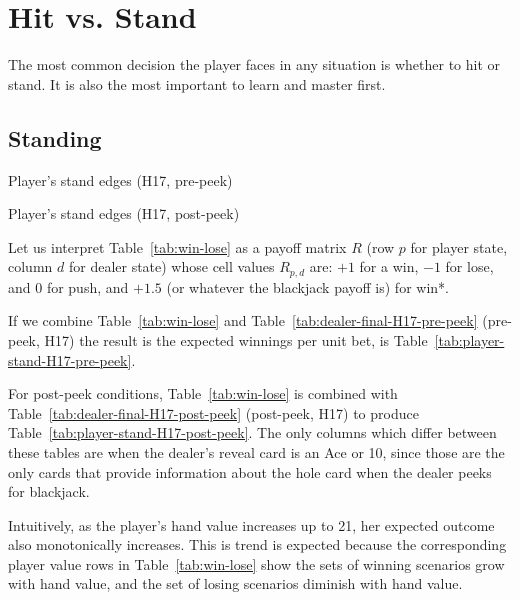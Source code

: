 \section{Hit vs. Stand}
\label{sec:basic:hit-stand}

The most common decision the player faces in any situation
is whether to hit or stand.
It is also the most important to learn and master first.

\subsection{Standing}
\label{sec:basic:hit-stand:stand}

\begin{table}[ht!]
\caption{Player's stand edges (H17, pre-peek)}
\begin{center}

\end{center}
\label{tab:player-stand-H17-pre-peek}
\end{table}

\begin{table}[ht!]
\caption{Player's stand edges (H17, post-peek)}
\begin{center}

\end{center}
\label{tab:player-stand-H17-post-peek}
\end{table}

Let us interpret Table~\ref{tab:win-lose} as a payoff matrix $R$
(row $p$ for player state, column $d$ for dealer state)
whose cell values $R_{p,d}$ are:
$+1$ for a win, $-1$ for lose, and $0$ for push, 
and $+1.5$ (or whatever the blackjack payoff is) for win*.

If we combine Table~\ref{tab:win-lose} and
Table~\ref{tab:dealer-final-H17-pre-peek} (pre-peek, H17) 
the result is the expected winnings per unit bet, 
is Table~\ref{tab:player-stand-H17-pre-peek}.

For post-peek conditions, Table~\ref{tab:win-lose} is combined with
Table~\ref{tab:dealer-final-H17-post-peek} (post-peek, H17) to produce
Table~\ref{tab:player-stand-H17-post-peek}.
The only columns which differ between these tables are when
the dealer's reveal card is an Ace or 10, since those are the only cards
that provide information about the hole card
when the dealer peeks for blackjack.

Intuitively, as the player's hand value increases up to 21, 
her expected outcome also monotonically increases.
This is trend is expected because the corresponding player value rows in
Table~\ref{tab:win-lose} show the sets of winning scenarios
grow with hand value, and the set of losing scenarios diminish with
hand value.  


